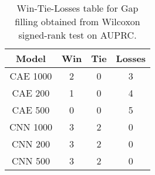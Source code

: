 \begin{table}
\centering
\caption{Win-Tie-Losses table for Gap filling obtained from Wilcoxon signed-rank test on AUPRC.}
\label{tab:gap_filling_model_training_data_comparison_AUPRC}
\begin{tabular}{|c|c|c|c|}
\toprule
\textbf{Model} &  \textbf{Win} &  \textbf{Tie} &  \textbf{Losses} \\
\midrule
      CAE 1000 &             2 &             0 &                3 \\
       CAE 200 &             1 &             0 &                4 \\
       CAE 500 &             0 &             0 &                5 \\
      CNN 1000 &             3 &             2 &                0 \\
       CNN 200 &             3 &             2 &                0 \\
       CNN 500 &             3 &             2 &                0 \\
\bottomrule
\end{tabular}
\end{table}
